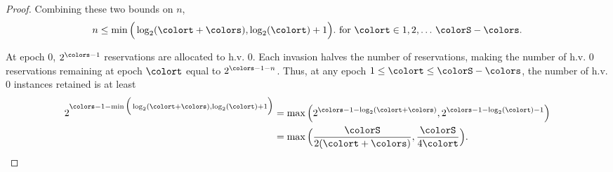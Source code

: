 \begin{proof}
Combining these two bounds on $n$,
\begin{align*}
n \leq
\min\Big(
  \log_2(\colort + \colors),
  \log_2(\colort) + 1
\Big).
\text{ for } \colort \in 1, 2, \ldots \, \colorS - \colors.
\end{align*}

At epoch 0, $2^{\colors - 1}$ reservations are allocated to h.v. 0.
Each invasion halves the number of reservations, making the number of h.v. 0 reservations remaining at epoch $\colort$ equal to $2^{\colors - 1 - n}$.
Thus, at any epoch $1 \leq \colort \leq \colorS - \colors$, the number of h.v. 0 instances retained is at least
\begin{align*}
2^{\colors - 1 - \min\Big(
  \log_2(\colort + \colors),
  \log_2(\colort) + 1
\Big)}
&= \max\Big(
  2^{\colors - 1 - \log_2(\colort + \colors)},
  2^{\colors - 1 - \log_2(\colort) - 1}
\Big)\\
&= \max\Big(
  \frac{\colorS}{2(\colort + \colors)},
  \frac{\colorS}{4\colort}
\Big).
\end{align*}

\end{proof}
